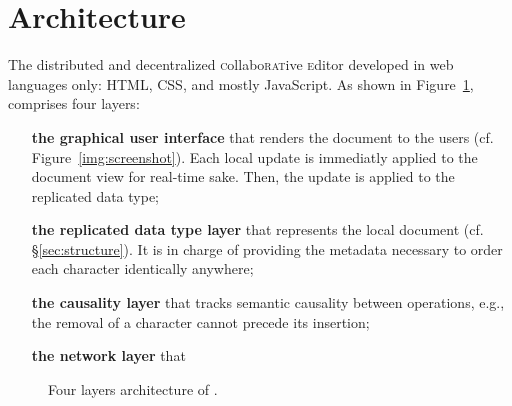 
\section{Architecture}
\label{sec:architecture}

The distributed and decentralized \textsc{c}ollabo\textsc{rat}ive
\textsc{e}ditor \CRATE developed in web languages only: HTML, CSS, and mostly
JavaScript. As shown in Figure~\ref{fig:architecture}, \CRATE comprises four
layers:
\begin{enumerate}[(i)]
\item [\textbf{the graphical user interface}] that renders the document to the users
  (cf. Figure~\ref{img:screenshot}). Each local update is immediatly applied to
  the document view for real-time sake. Then, the update is applied to the
  replicated data type;
\item [\textbf{the replicated data type layer}] that represents the local document
  (cf. §\ref{sec:structure}). It is in charge of providing the metadata
  necessary to order each character identically anywhere;
\item [\textbf{the causality layer}] that tracks semantic causality between operations,
  e.g., the removal of a character cannot precede its insertion;
\item [\textbf{the network layer}] that
\end{enumerate}

\begin{figure}
  \centering
  
  \caption{\label{fig:architecture} Four layers architecture of \CRATE.}
\end{figure}


